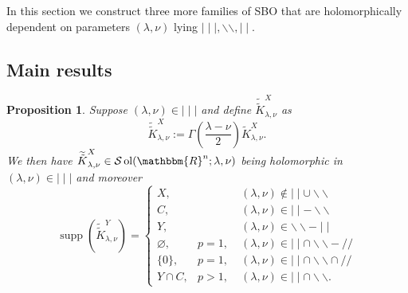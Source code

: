 \documentclass[12pt]{article}
\newcommand{\assign}{:=}
\newcommand{\nin}{\not\in}
\newcommand{\tmop}[1]{\ensuremath{\operatorname{#1}}}
\newtheorem{proposition}{Proposition}[section]
\theoremstyle{remark}
\begin{document}
In this section we construct three more families of SBO that are
holomorphically dependent on parameters $(\lambda, \nu)$ lying $\mid \mid
\mid, \backslash\backslash, \mid \mid$.

\subsection{Main results}

\begin{proposition}
  \label{supp-sing:prop-supp-mmm}Suppose $(\lambda, \nu) \in \mid \mid \mid$
  and define $\widetilde{\tilde{K}}_{\lambda, \nu}^X$ as
  \[ \widetilde{\tilde{K}}_{\lambda, \nu}^X \assign \Gamma \left(
     \frac{\lambda - \nu}{2} \right) \tilde{K}_{\lambda, \nu}^X . \]
  We then have $\widetilde{\tilde{K}}_{\lambda, \nu}^X \in
  \mathcal{S} \tmop{ol} (\mathbbm{R}^n ; \lambda, \nu)$ being holomorphic in $
  (\lambda, \nu) \in \mid \mid \mid$ and moreover
  \[ \tmop{supp} (\widetilde{\tilde{K}}_{\lambda, \nu}^Y) = \left\{
     \begin{array}{lll}
       X, &  & (\lambda, \nu) \nin \mid \mid \cup \backslash\backslash\\
       C, &  & (\lambda, \nu) \in \mid \mid -\backslash\backslash\\
       Y, &  & (\lambda, \nu) \in \backslash\backslash - \mid \mid\\
       \varnothing, & p = 1, \; & (\lambda, \nu) \in \mid \mid \cap
       \backslash\backslash - / /\\
       \{ 0 \}, & p = 1, & (\lambda, \nu) \in \mid \mid \cap
       \backslash\backslash \cap / /\\
       Y \cap C, & p > 1, & (\lambda, \nu) \in \mid \mid \cap
       \backslash\backslash .
     \end{array} \right. \]
\end{proposition}
\end{document}
